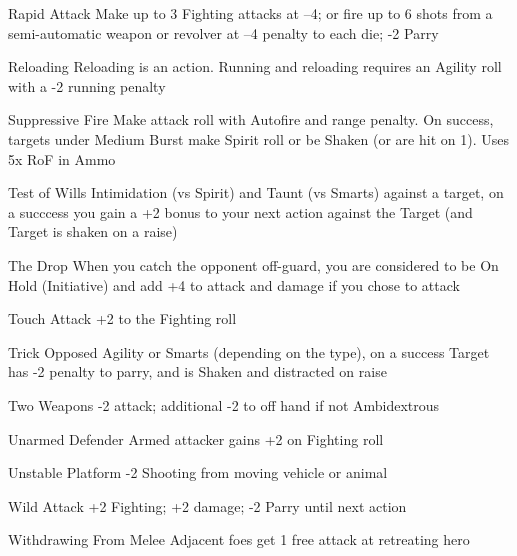 \begin{genericsection}{Rapid Attack}
Make up to 3 Fighting attacks at –4; or fire up to 6 shots from a semi-automatic weapon or revolver at –4 penalty to each die; -2 Parry
\end{genericsection}

\begin{genericsection}{Reloading}
Reloading is an action. Running and reloading requires an Agility roll with a -2 running penalty
\end{genericsection}

\begin{genericsection}{Suppressive Fire}
Make attack roll with Autofire and range penalty. On success, targets under Medium Burst make Spirit roll or be Shaken (or are hit on 1). Uses 5x RoF in Ammo
\end{genericsection}

\begin{genericsection}{Test of Wills}
Intimidation (vs Spirit) and Taunt (vs Smarts) against a target, on a succcess you gain a +2 bonus to your next action against the Target (and Target is shaken on a raise)
\end{genericsection}

\begin{genericsection}{The Drop}
When you catch the opponent off-guard, you are considered to be On Hold (Initiative) and add +4 to attack and damage if you chose to attack
\end{genericsection}

\begin{genericsection}{Touch Attack}
+2 to the Fighting roll
\end{genericsection}

\begin{genericsection}{Trick}
Opposed Agility or Smarts (depending on the type), on a success Target has -2 penalty to parry, and is Shaken and distracted on raise
\end{genericsection}

\begin{genericsection}{Two Weapons}
-2 attack; additional -2 to off hand if not Ambidextrous
\end{genericsection}

\begin{genericsection}{Unarmed Defender}
Armed attacker gains +2 on Fighting roll
\end{genericsection}

\begin{genericsection}{Unstable Platform}
-2 Shooting from moving vehicle or animal
\end{genericsection}

\begin{genericsection}{Wild Attack}
+2 Fighting; +2 damage; -2 Parry until next action
\end{genericsection}

\begin{genericsection}{Withdrawing From Melee}
Adjacent foes get 1 free attack at retreating hero
\end{genericsection}
